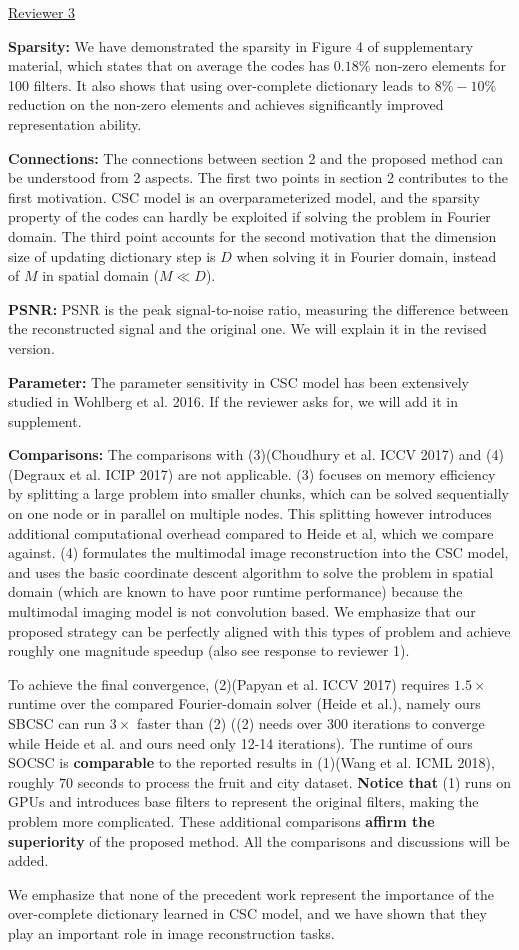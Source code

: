 \documentclass[10pt,twocolumn,letterpaper]{article}
\begin{document}
\underline{Reviewer 3}

\textbf{Sparsity:}
We have demonstrated the sparsity in Figure 4 of supplementary material, which states that on average the codes has $0.18\%$ non-zero elements for 100 filters. It also shows that using over-complete dictionary leads to $8\% - 10\%$ reduction on the non-zero elements and achieves significantly improved representation ability.

\textbf{Connections:}
The connections between section 2 and the proposed method can be understood from 2 aspects. The first two points in section 2 contributes to the first motivation. CSC model is an overparameterized model, and the sparsity property of the codes can hardly be exploited if solving the problem in Fourier domain. The third point accounts for the second motivation that the dimension size of updating dictionary step is $D$ when solving it in Fourier domain, instead of $M$ in spatial domain ($M \ll D$).

\textbf{PSNR:}
PSNR is the peak signal-to-noise ratio, measuring the difference between the reconstructed signal and the original one. We will explain it in the revised version.

\textbf{Parameter:}
The parameter sensitivity in CSC model has been extensively studied in Wohlberg et al. 2016. If the reviewer asks for, we will add it in supplement.

\textbf{Comparisons:}
The comparisons with (3)(Choudhury et al. ICCV 2017) and (4)(Degraux et al. ICIP 2017) are not applicable. (3) focuses on memory
efficiency by splitting a large problem into smaller chunks, which can be solved sequentially on one node or in parallel on multiple
nodes. This splitting however introduces additional computational overhead compared to Heide et al, which we compare against. (4) formulates the multimodal image reconstruction into the CSC model, and uses the basic coordinate descent algorithm to solve the problem in spatial domain (which are known to have poor runtime performance) because the multimodal imaging model is not convolution based. We emphasize that our proposed strategy can be perfectly aligned with this types of problem and achieve roughly one magnitude speedup (also see response to reviewer 1).
 

To achieve the final convergence, (2)(Papyan et al. ICCV 2017) requires $1.5 \times$ runtime over the compared Fourier-domain solver (Heide et al.), namely ours SBCSC can run $3 \times$ faster than (2) ((2) needs over 300 iterations to converge while Heide et al. and ours need only 12-14 iterations). The runtime of ours SOCSC is \textbf{comparable} to the reported results in (1)(Wang et al. ICML 2018), roughly $70$ seconds to process the fruit and city dataset. \textbf{Notice that} (1) runs on GPUs and introduces base filters to represent the original filters, making the problem more complicated. These additional comparisons \textbf{affirm the superiority} of the proposed method. All the comparisons and discussions will be added.

We emphasize that none of the precedent work represent the importance of the over-complete dictionary learned in CSC model, and we have shown that they play an important role in image reconstruction tasks.

%
%
\end{document}
